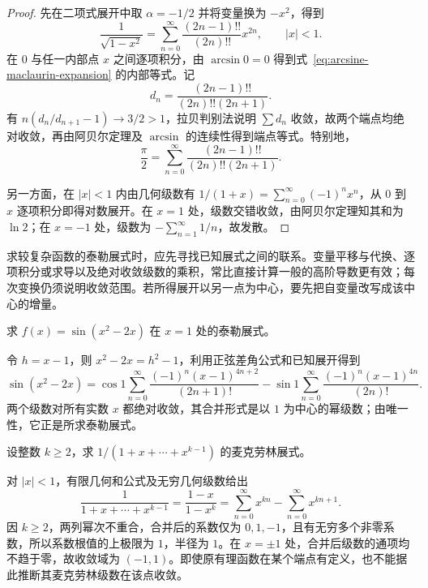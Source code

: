 \begin{proof}
先在二项式展开中取 $\alpha=-1/2$ 并将变量换为 $-x^2$，得到
\[
    \frac1{\sqrt{1-x^2}}
       =\sum_{n=0}^\infty\frac{(2n-1)!!}{(2n)!!}x^{2n},
    \qquad |x|<1.
\]
在 $0$ 与任一内部点 $x$ 之间逐项积分，由 $\arcsin0=0$ 得到式~\eqref{eq:arcsine-maclaurin-expansion} 的内部等式。记
\[
    d_n=\frac{(2n-1)!!}{(2n)!!(2n+1)}.
\]
有 $n(d_n/d_{n+1}-1)\to3/2>1$，拉贝判别法说明 $\sum d_n$ 收敛，故两个端点均绝对收敛，再由阿贝尔定理及 $\arcsin$ 的连续性得到端点等式。特别地，
\begin{equation}
    \frac\pi2=\sum_{n=0}^\infty
       \frac{(2n-1)!!}{(2n)!!(2n+1)}.
    \label{eq:pi-by-arcsine-series}
\end{equation}

另一方面，在 $|x|<1$ 内由几何级数有 $1/(1+x)=\sum_{n=0}^\infty(-1)^nx^n$，从 $0$ 到 $x$ 逐项积分即得对数展开。在 $x=1$ 处，级数交错收敛，由阿贝尔定理知其和为 $\ln2$；在 $x=-1$ 处，级数为 $-\sum_{n=1}^\infty1/n$，故发散。
\end{proof}

求较复杂函数的泰勒展式时，应先寻找已知展式之间的联系。变量平移与代换、逐项积分或求导以及绝对收敛级数的乘积，常比直接计算一般的高阶导数更有效；每次变换仍须说明收敛范围。若所得展开以另一点为中心，要先把自变量改写成该中心的增量。

\begin{example}
\label{ex:shifted-sine-composition-taylor-expansion}
求 $f(x)=\sin(x^2-2x)$ 在 $x=1$ 处的泰勒展式。
\end{example}

\begin{solve}
令 $h=x-1$，则 $x^2-2x=h^2-1$，利用正弦差角公式和已知展开得到
\[
    \sin(x^2-2x)
       =\cos1\sum_{n=0}^\infty
           \frac{(-1)^n(x-1)^{4n+2}}{(2n+1)!}
        -\sin1\sum_{n=0}^\infty
           \frac{(-1)^n(x-1)^{4n}}{(2n)!}.
\]
两个级数对所有实数 $x$ 都绝对收敛，其合并形式是以 $1$ 为中心的幂级数；由唯一性，它正是所求泰勒展式。
\end{solve}

\begin{example}
\label{ex:finite-geometric-denominator-expansion}
设整数 $k\geq2$，求 $\displaystyle1/(1+x+\cdots+x^{k-1})$ 的麦克劳林展式。
\end{example}

\begin{solve}
对 $|x|<1$，有限几何和公式及无穷几何级数给出
\[
    \frac1{1+x+\cdots+x^{k-1}}
       =\frac{1-x}{1-x^k}
       =\sum_{n=0}^\infty x^{kn}-\sum_{n=0}^\infty x^{kn+1}.
\]
因 $k\geq2$，两列幂次不重合，合并后的系数仅为 $0,1,-1$，且有无穷多个非零系数，所以系数根值的上极限为 $1$，半径为 $1$。在 $x=\pm1$ 处，合并后级数的通项均不趋于零，故收敛域为 $(-1,1)$。即使原有理函数在某个端点有定义，也不能据此推断其麦克劳林级数在该点收敛。
\end{solve}

